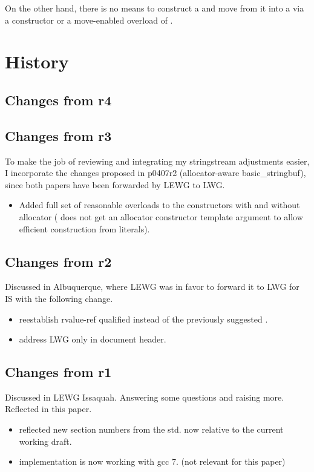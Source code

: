 \documentclass[ebook,11pt,article]{memoir}
\begin{document}
On the other hand, there is no means to construct a  and move from it into a  via a constructor or a move-enabled overload of .

\section{History}

\subsection{Changes from r4}


\subsection{Changes from r3}
To make the job of reviewing and integrating my stringstream adjustments easier, I incorporate the changes proposed in p0407r2 (allocator-aware basic\_stringbuf), since both papers have been forwarded by LEWG to LWG.
\begin{itemize}
\item Added full set of reasonable overloads to the constructors with and without allocator ( does not get an allocator constructor template argument to allow efficient construction from  literals).
\end{itemize}


\subsection{Changes from r2}
Discussed in Albuquerque, where LEWG was in favor to forward it to LWG for IS with the following change.
\begin{itemize}
\item reestablish rvalue-ref qualified  instead of the previously suggested .
\item address LWG only in document header.
\end{itemize}


\subsection{Changes from r1}
Discussed in LEWG Issaquah. Answering some questions and raising more. Reflected in this paper.
\begin{itemize}
\item reflected new section numbers from the std. now relative to the current working draft.
\item implementation is now working with gcc 7. (not relevant for this paper)
\end{itemize}
\end{document}
